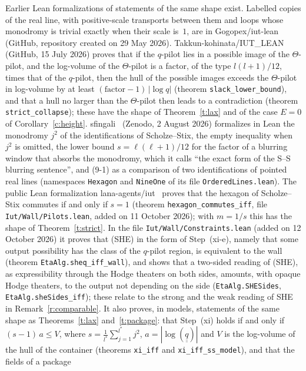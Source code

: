 \documentclass[11pt,a4paper]{article}
\newcommand{\qq}{\underline{\underline{q}}{}}
\newcommand{\q}[1]{``#1''}
\theoremstyle{plain}
\theoremstyle{definition}
\theoremstyle{remark}
\begin{document}
Earlier Lean formalizations of statements of the same shape exist. Labelled copies of the real line, with
positive-scale transports between them and loops whose monodromy is trivial exactly when their scale is~$1$, are in
Gogopex/iut-lean~\cite{Go} (GitHub, repository created on 29 May 2026). Takkun-kohinata/IUT\_LEAN~\cite{TK} (GitHub,
15 July 2026) proves that if the $q$-pilot lies in a possible image of the $\Theta$-pilot, and the log-volume of the $\Theta$-pilot
is a factor, of the type $l(l+1)/12$, times that of the $q$-pilot, then the hull of the possible images exceeds the
$\Theta$-pilot in log-volume by at least $(\text{factor}-1)\,|\log q|$ (theorem \texttt{slack\_lower\_bound}), and
that a hull no larger than the $\Theta$-pilot then leads to a contradiction (theorem \texttt{strict\_collapse}); these
have the shape of Theorem~\ref{t:lax} and of the case $E=0$ of Corollary~\ref{c:height}. sfingali~\cite{Sf} (Zenodo,
2 August 2026) formalizes in Lean the monodromy $j^2$ of the identifications of Scholze--Stix, the empty inequality
when $j^2$ is omitted, the lower bound $s=\ell(\ell+1)/12$ for the factor of a blurring window that absorbs the
monodromy, which it calls \q{the exact form of the S--S blurring sentence}, and (9-1) as a comparison of two
identifications of pointed real lines (namespaces \texttt{Hexagon} and \texttt{NineOne} of its file
\texttt{OrderedLines.lean}). The public Lean formalization lana-agents/iut~\cite{LANAiut} proves that the hexagon of
Scholze--Stix commutes if and only if $s=1$ (theorem \texttt{hexagon\_commutes\_iff}, file
\texttt{Iut/Wall/Pilots.lean}, added on 11 October 2026); with $m=1/s$ this has the shape of Theorem~\ref{t:strict}.
In the file \texttt{Iut/Wall/Constraints.lean} (added on 12 October 2026) it proves that (SHE) in the form of
Step~(xi-e), namely that some output possibility has the class of the $q$-pilot region, is equivalent to the wall
(theorem \texttt{EtaAlg.sheq\_iff\_wall}), and shows that a two-sided reading of (SHE), as expressibility through the
Hodge theaters on both sides, amounts, with opaque Hodge theaters, to the output not depending on the side
(\texttt{EtaAlg.SHESides}, \texttt{EtaAlg.sheSides\_iff}); these relate to the strong and the weak reading of SHE in
Remark~\ref{r:comparable}. It also proves, in
models, statements of the same shape as Theorems~\ref{t:lax} and~\ref{t:package}: that Step~(xi) holds if and only if
$(s-1)\,a\le V$, where $s=\frac{1}{l^\ast}\sum_{j=1}^{l^\ast}j^2$, $a=|\log(\qq)|$ and $V$ is the log-volume of the
hull of the container (theorems \texttt{xi\_iff} and \texttt{xi\_iff\_ss\_model}), and that the fields of a package
\end{document}
